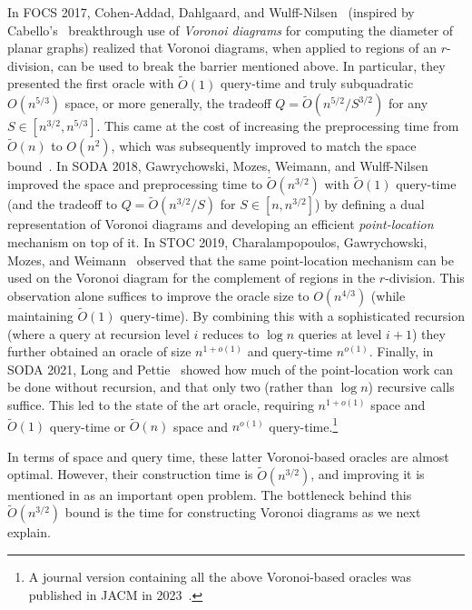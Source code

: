 \documentclass{article}
\newcommand{\Otild}{\tilde{O}}
\begin{document}
In FOCS 2017, Cohen-Addad, Dahlgaard, and Wulff-Nilsen~\cite{Cohen-AddadDW17} (inspired by Cabello's~\cite{Cabello19} breakthrough use of \emph{Voronoi diagrams} for computing the diameter of planar graphs) realized that Voronoi diagrams, when applied to regions of an $r$-division, can be used to break the barrier mentioned above.
In particular, they presented the first oracle with $\tilde O(1)$ query-time and truly subquadratic $O(n^{5/3})$ space, or more generally, the tradeoff $Q=\tilde{O}(n^{5/2}/S^{3/2})$ for any $S\in[n^{3/2},n^{5/3}]$.
This came at the cost of increasing the preprocessing time from $\Otild(n)$ to $O(n^2)$, which was subsequently improved to match the space bound~\cite{DBLP:journals/siamcomp/GawrychowskiKMS21}.
In SODA 2018, Gawrychowski, Mozes, Weimann, and Wulff-Nilsen~\cite{GawrychowskiMWW18} improved the space and preprocessing time to $\tilde{O}(n^{3/2})$ with $\tilde O(1)$ query-time (and the tradeoff to $Q=\tilde{O}(n^{3/2}/S)$ for $S\in[n,n^{3/2}]$) by defining a dual representation of Voronoi diagrams and developing an efficient {\em point-location} mechanism on top of it.
In STOC 2019, Charalampopoulos, Gawrychowski, Mozes, and Weimann~\cite{CharalampopoulosGMW19} observed that the same point-location mechanism can be used on the Voronoi diagram for the complement of regions in the $r$-division. This observation alone suffices to improve the oracle size to $O(n^{4/3})$ (while maintaining $\tilde O(1)$ query-time).
By combining this with a sophisticated recursion (where a query at recursion level $i$ reduces to $\log n$ queries at level $i+1$) they further obtained an oracle of size $n^{1+o(1)}$ and query-time $n^{o(1)}$. Finally, in SODA 2021,
Long and Pettie~\cite{LongPettie} showed how much of the point-location work can be done  without recursion, and that only two (rather than $\log n$) recursive calls suffice. This led to the state of the art oracle, requiring $n^{1+o(1)}$ space and $\tilde O(1)$ query-time or $\tilde O(n)$ space and $n^{o(1)}$ query-time.\footnote{A journal version containing all the above Voronoi-based oracles was published in JACM in 2023~\cite{ourJACM}.}

In terms of space and query time, these latter Voronoi-based oracles are almost optimal. However, their construction time is $\tilde O(n^{3/2})$, and improving it is mentioned in \cite{ourJACM} as an important open problem. The bottleneck behind this $\tilde O(n^{3/2})$ bound is the time for constructing Voronoi diagrams as we next explain.
\end{document}
